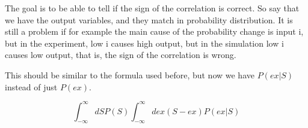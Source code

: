 \documentclass{article}
\begin{document}

The goal is to be able to tell if the sign of the correlation is
correct.  So say that we have the output variables, and they match in
probability distribution.  It is still a problem if for example the
main cause of the probability change is input i, but in the
experiment, low i causes high output, but in the simulation low i
causes low output, that is, the sign of the correlation is wrong.

This should be similar to the formula used before, but now we have
$P(ex | S)$ instead of just $P(ex)$.

\begin{equation}
  \int_{-\infty}^{\infty}dSP(S) \int_{-\infty}^{\infty} dex(S-ex) P(ex | S)
\end{equation}
\end{document}
